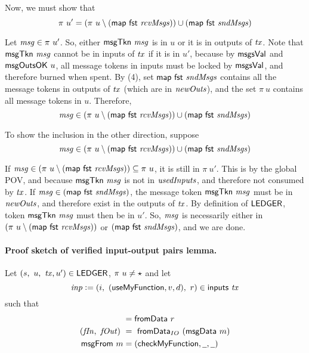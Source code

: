 Now, we must show that
\[ \pi~u' = (\pi~u \setminus (\mathsf{map}~\mathsf{fst}~\mathit{rcvMsgs})) \cup (\mathsf{map}~\mathsf{fst}~\mathit{sndMsgs}) \]

Let $\mathit{msg} \in \pi~u'$. So, either $\mathsf{msgTkn}~\mathit{msg}$ is in $u$ or
it is in outputs of $\mathit{tx}$. Note that $\mathsf{msgTkn}~\mathit{msg}$ cannot be in
inputs of $\mathit{tx}$ if it is in $u'$, because by $\mathsf{msgsVal}$ and $\mathsf{msgOutsOK}~u$,
all message tokens in inputs must be locked by $\mathsf{msgsVal}$, and therefore burned when spent.
By (4), set $\mathsf{map}~\mathsf{fst}~\mathit{sndMsgs}$
contains all the message tokens in outputs of $\mathit{tx}$ (which are in $\mathit{newOuts}$),
and the set $\pi~u$ contains all message tokens in $u$. Therefore,
\[ \mathit{msg} \in (\pi~u \setminus (\mathsf{map}~\mathsf{fst}~\mathit{rcvMsgs})) \cup (\mathsf{map}~\mathsf{fst}~\mathit{sndMsgs}) \]

To show the inclusion in the other direction, suppose
\[\mathit{msg} \in (\pi~u \setminus (\mathsf{map}~\mathsf{fst}~\mathit{rcvMsgs})) \cup (\mathsf{map}~\mathsf{fst}~\mathit{sndMsgs})\]

If $\mathit{msg} \in (\pi~u \setminus (\mathsf{map}~\mathsf{fst}~\mathit{rcvMsgs})) \subseteq \pi~u$,
it is still in $\pi~u'$. This is by the global POV, and because $\mathsf{msgTkn}~\mathit{msg}$ is
not in $\mathit{usedInputs}$, and therefore
not consumed by $\mathit{tx}$. If $\mathit{msg} \in (\mathsf{map}~\mathsf{fst}~\mathit{sndMsgs})$,
the message token $\mathsf{msgTkn}~\mathit{msg}$ must be in $\mathit{newOuts}$, and therefore exist in the outputs of $\mathit{tx}$.
By definition of $\mathsf{LEDGER}$, token $\mathsf{msgTkn}~\mathit{msg}$ must then be in $u'$. So, $\mathit{msg}$
is necessarily either in $(\pi~u \setminus (\mathsf{map}~\mathsf{fst}~\mathit{rcvMsgs}))$ or
$ (\mathsf{map}~\mathsf{fst}~\mathit{sndMsgs})$, and we are done.

\paragraph{Proof sketch of verified input-output pairs lemma. }
\label{pf:io-pairs}

Let $(s,~u,~\mathit{tx}, u') \in \mathsf{LEDGER}$, $\pi~u \neq \star$ and let
\[\mathit{inp} \mathrel{\mathop:}= (i, ~(\mathsf{useMyFunction}, v, d),~ r) \in \mathsf{inputs}~\mathit{tx}\]
such that
\begin{align*}
  [(\receive,~\Msg~m)] &= \fun{fromData}~r \\
  (\var{fIn},~\var{fOut}) ~&=~\fun{fromData}_{IO}~(\fun{msgData}~m) \\
  \fun{msgFrom}~m &= (\mathsf{checkMyFunction}, \wcard, \wcard)
\end{align*}

